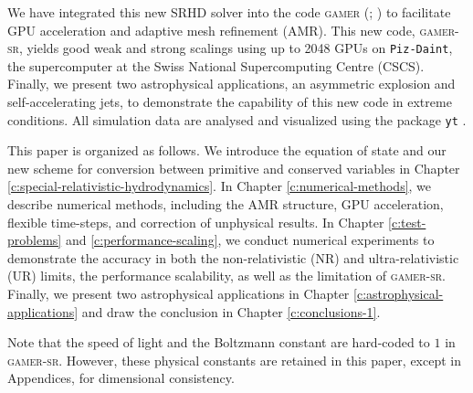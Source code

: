 We have integrated this new SRHD solver into the code \textsc{gamer}
(\citealt{gamer-1}; \citealt{gamer-2}) to facilitate GPU acceleration and adaptive mesh
refinement (AMR). This new code, \textsc{gamer-sr}, yields good weak and strong
scalings using up to 2048 GPUs on \texttt{Piz-Daint}, the supercomputer at the Swiss
National Supercomputing Centre (CSCS). Finally, we present two astrophysical applications,
an asymmetric explosion and self-accelerating jets, to demonstrate the capability of
this new code in extreme conditions. All simulation data are analysed and visualized
using the package \texttt{yt} \citep{YT}.

This paper is organized as follows. We introduce the equation of state and our new scheme
for conversion between primitive and conserved variables in Chapter
\ref{c:special-relativistic-hydrodynamics}. In Chapter \ref{c:numerical-methods}, we describe
numerical methods, including the AMR structure, GPU acceleration, flexible time-steps,
and correction of unphysical results. In Chapter \ref{c:test-problems} and
\ref{c:performance-scaling}, we conduct numerical experiments to demonstrate the accuracy in
both the non-relativistic (NR) and ultra-relativistic (UR) limits, the performance scalability,
as well as the limitation of \textsc{gamer-sr}. Finally, we present two astrophysical
applications in Chapter \ref{c:astrophysical-applications} and draw the
conclusion in Chapter \ref{c:conclusions-1}.

Note that the speed of light and the Boltzmann constant are hard-coded to
$1$ in \textsc{gamer-sr}. However, these physical constants are retained in this paper,
except in Appendices, for dimensional consistency.
